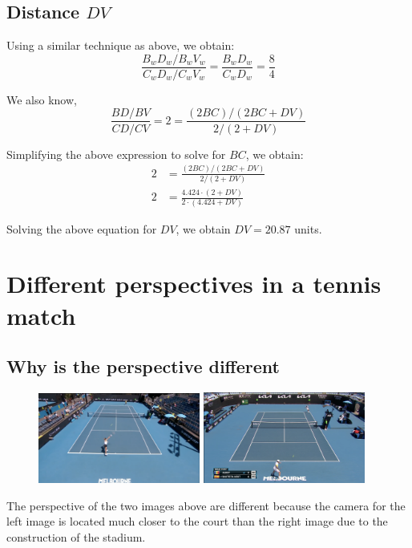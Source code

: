 \documentclass[12pt, oneside]{article}
\begin{document}
\subsection{Distance $DV$}

Using a similar technique as above, we obtain:
$$\frac{B_wD_w/B_wV_w}{C_wD_w/C_wV_w} = \frac{B_wD_w}{C_wD_w}  
= \frac{8}{4} $$

We also know, 
$$\frac{BD/BV}{CD/CV}  = 2 = 
\frac{(2BC)/(2BC+DV)}{2/(2 + DV)}$$

Simplifying the above expression to solve for $BC$, we obtain:
\begin{align*}
    2 &= \frac{(2BC)/(2BC+DV)}{2/(2 + DV)}\\
    2 &= \frac{4.424 \cdot (2 + DV)}{2 \cdot (4.424 + DV)}
\end{align*}

Solving the above equation for $DV$, we obtain $DV = 20.87$ units.

\clearpage
\section{Different perspectives in a tennis match}
\subsection{Why is the perspective different}

\begin{figure}[H]
    \includegraphics[width=0.475\textwidth]{imgs/tennis1_original}
    \hfill
    \includegraphics[width=0.475\textwidth]{imgs/tennis2_original}
  \end{figure}

The perspective of the two images above are different because the camera for the 
left image is located much closer to the court than the right image due to the
construction of the stadium.
\end{document}
